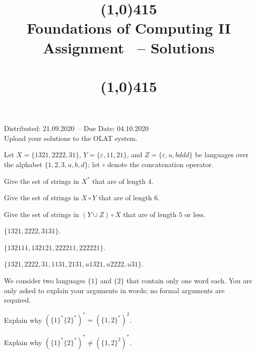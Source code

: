 \documentclass{exercise}
\title{\line(1,0){415}\\
  Foundations of Computing II\\
  \Large Assignment \theexercise\ -- Solutions\\[1em]
  \large{\topics}\\
  \line(1,0){415}}
\newcommand{\distdate}{21.09.2020}
\newcommand{\duedate}{04.10.2020}
\begin{document}
\maketitle

\begin{center}
  Distributed: \distdate\ -- Due Date: \duedate\\[1em]
  Upload your solutions to the OLAT system.\\[3em]
\end{center}


\subtask Let $X = \{1321,2222,31\}$, $Y =\{\varepsilon,11,21\}$, and
  $Z = \{\varepsilon,u,bddd\}$ be languages over the alphabet $\{1,2,3,u,b,d\}$;
  let $\circ$ denote the concatenation operator.
  \begin{taskitems}
    \item Give the set of strings in $X^*$ that are of length $4$.
    \item Give the set of strings in $X \circ Y$ that are of length $6$.
    \item Give the set of strings in $(Y \cup Z) \circ X$ that are of length $5$ or less.
  \end{taskitems}

  \begin{solution}
    \begin{taskitems}
      \item $\{1321,2222,3131\}$.
      \item $\{132111,132121,222211,222221\}$.
      \item $\{1321,2222,31,1131,2131,u1321,u2222,u31\}$.
    \end{taskitems}
  \end{solution}

\subtask We consider two languages $\{1\}$ and $\{2\}$ that contain only one word each.
  You are only asked to explain your arguments in words; no formal arguments are
  required. 
  \begin{taskitems}
    \item Explain why $(\{1\}^*\{2\}^*)^* =   (\{1,2\}^*)^2$.
    \item Explain why $(\{1\}^*\{2\}^*)^* \ne (\{1,2\}^2)^*$.
  \end{taskitems}
\end{document}
